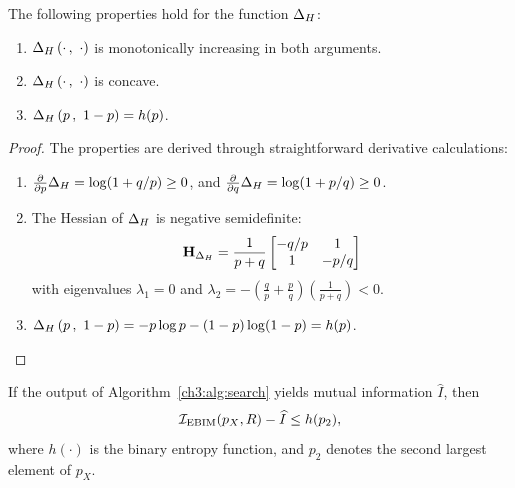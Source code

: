 \begin{lemma}\label{ch3:lem:DeltaH}
    The following properties hold for the function $\Delta_H$:
    \begin{enumerate}
        \item $\Delta_H\left(\cdot \, , \ \cdot\right)$ is monotonically increasing in both arguments. \label{ch3:lem:DeltaH1}
        \item $\Delta_H\left(\cdot \, , \ \cdot\right)$ is concave.
        \item $\Delta_H\left(p \, , \ 1-p\right) = h(p)$. \label{ch3:lem:DeltaH3}
    \end{enumerate}
\end{lemma}
\begin{proof}
    The properties are derived through straightforward derivative calculations:
    \begin{enumerate}
        \item $\frac{\partial}{\partial p}\Delta_H = \log (1+q/p) \geq 0$, and 
              $\frac{\partial}{\partial q}\Delta_H = \log (1+p/q) \geq 0$.
        \item The Hessian of $\Delta_H$ is negative semidefinite:
        \[
            \mathbf{H}_{\Delta_H} = \frac{1}{p+q} \begin{bmatrix} 
            -q/p & 1  \\
            1 & -p/q  \\
            \end{bmatrix}
        \]
        with eigenvalues $\lambda_1=0$ and $\lambda_2 = - (\frac{q}{p}+\frac{p}{q})(\frac{1}{p+q}) < 0$.
        \item $\Delta_H\left(p \, , \ 1-p\right) = -p\log p - (1-p)\log(1-p) = h(p)$.
        
    \end{enumerate}
\end{proof}

\begin{theorem}
    If the output of Algorithm~\ref{ch3:alg:search} yields mutual information $\widehat{I}$, then 
    \[\mathcal{I}_\text{EBIM}(p_X, R) - \widehat{I} \leq h(p_2),\] where $h(\cdot)$ is the binary entropy function, and $p_2$ denotes the second largest element of $p_X$.
\end{theorem}

